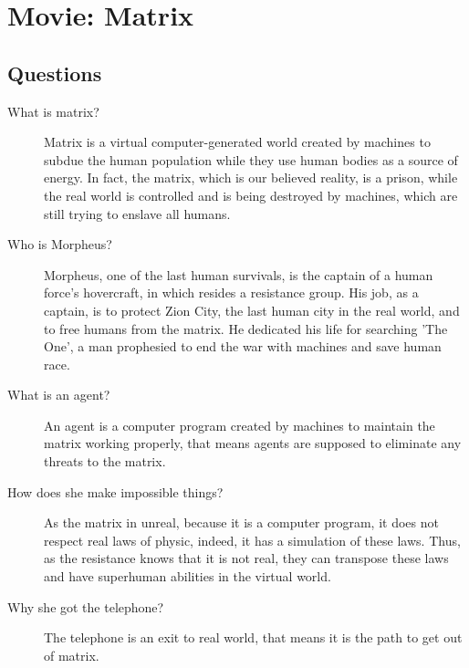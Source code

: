 \documentclass[a4paper,12pt]{article}
\begin{document}
\titleTMB 
\newpage
{} %


\section*{Movie: Matrix}
\subsection*{Questions}

\begin{description}

\item[What is matrix?]
  {
    Matrix is a virtual computer-generated world created by machines to subdue
    the human population while they use human bodies as a source of energy. In
    fact, the matrix, which is our believed reality, is a prison, while the real 
    world  is controlled and  is being  destroyed by  machines, which  are still
    trying to enslave all humans.
  }
  
\item[Who is Morpheus?]{
    Morpheus, one  of the last human survivals,  is the captain of  a human force's
    hovercraft, in which resides a resistance group. His job, as a captain, is to protect Zion City, the last human city
    in the real world, and to free humans from the matrix. He dedicated his life
    for searching 'The One', a man prophesied to end the war with machines and save human race.
  }
  
\item[What is an agent?]
  {
    An agent  is a computer program created by machines to
    maintain the matrix working properly, that means agents are supposed to eliminate any threats to the matrix.
  }


\item[How does she make impossible things?]{ As the matrix in unreal, because it
    is a computer program, it does not respect real laws of physic, indeed, it has
    a simulation of these laws. Thus, as the resistance knows that it is not real,
    they can transpose these laws and have superhuman abilities in the virtual world.
  }

\item[Why she got the telephone?]{
    The telephone is an exit to real world, that means it is the path to get out
    of matrix.
  }


\end{description}
\end{document}
